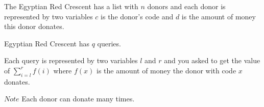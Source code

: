 The Egyptian Red Crescent has a list with $n$ donors and each donor is represented by two variables $c$ is the donor's code and $d$ is the amount of money this donor donates.

Egyptian Red Crescent has $q$ queries. 

Each query is represented by two variables $l$ and $r$ and you asked to get the value of ${\sum_{i = l}^r f(i)}$ where $f(x)$ is the amount of money the donor with code $x$ donates.

$Note$ Each donor can donate many times.
